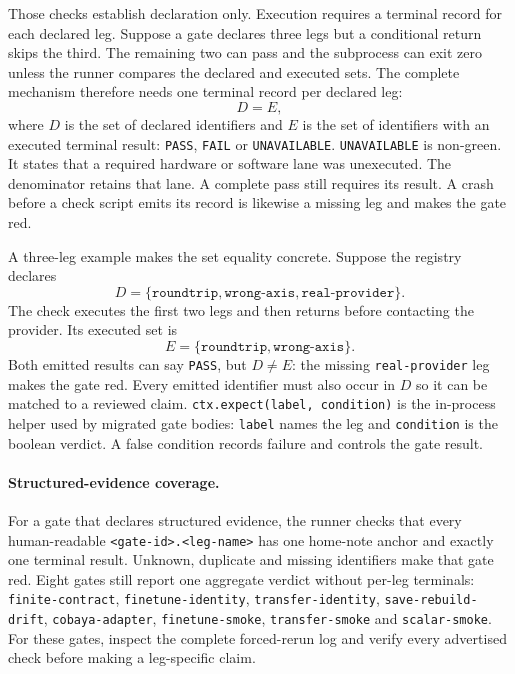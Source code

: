 \documentclass[10pt,aps,prd,twocolumn,nofootinbib]{revtex4-2}
\newcommand{\code}[1]{\texttt{#1}}
\begin{document}
Those checks establish declaration only.  Execution requires a terminal record
for each declared leg.  Suppose a gate declares three legs but a conditional
return skips the third.  The remaining two can
pass and the subprocess can exit zero unless the runner compares the declared
and executed sets.  The complete mechanism therefore needs one terminal
record per declared leg:
\begin{equation*}
 D=E,
\end{equation*}
where \(D\) is the set of declared identifiers and \(E\) is the set of
identifiers with an executed terminal result: \code{PASS}, \code{FAIL} or
\code{UNAVAILABLE}.
\code{UNAVAILABLE} is non-green.  It states that a required hardware or
software lane was unexecuted.  The denominator retains that lane.  A complete
pass still requires its result.  A crash before a check script emits its
record is likewise a missing leg and makes the gate red.

A three-leg example makes the set equality concrete.  Suppose the registry
declares
\begin{equation*}
 D=\{\code{roundtrip},\code{wrong-axis},\code{real-provider}\}.
\end{equation*}
The check executes the first two legs and then returns before contacting the
provider.  Its executed set is
\begin{equation*}
 E=\{\code{roundtrip},\code{wrong-axis}\}.
\end{equation*}
Both emitted results can say \code{PASS}, but $D\ne E$: the missing
\code{real-provider} leg makes the gate red.  Every emitted identifier must
also occur in $D$ so it can be matched to a reviewed claim.
\code{ctx.expect(label, condition)} is the in-process helper
used by migrated gate bodies: \code{label} names the leg and \code{condition}
is the boolean verdict.  A false condition records failure and controls the
gate result.

\paragraph{Structured-evidence coverage.}
For a gate that declares structured evidence, the runner checks that every
human-readable \code{<gate-id>.<leg-name>} has one home-note anchor and exactly
one terminal result.  Unknown, duplicate and missing identifiers make that
gate red.  Eight gates still report one aggregate verdict without per-leg
terminals: \code{finite-contract}, \code{finetune-identity},
\code{transfer-identity}, \code{save-rebuild-drift},
\code{cobaya-adapter}, \code{finetune-smoke}, \code{transfer-smoke} and
\code{scalar-smoke}.  For these gates, inspect the complete forced-rerun log
and verify every advertised check before making a leg-specific claim.
\end{document}
